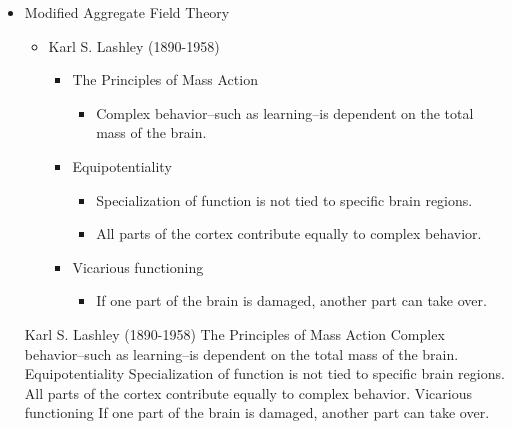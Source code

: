 \begin{itemize}
\item Modified Aggregate Field Theory 
\begin{itemize}
    \item Karl S. Lashley (1890-1958)
    \begin{itemize}
        \item The Principles of Mass Action
        \begin{itemize}
            \item Complex behavior--such as learning--is dependent on the total mass of the brain.
        \end{itemize}
        \item Equipotentiality
        \begin{itemize}
            \item Specialization of function is not tied to specific brain regions.
            \item All parts of the cortex contribute equally to complex behavior.
        \end{itemize}
        \item Vicarious functioning
        \begin{itemize}
            \item If one part of the brain is damaged, another part can take over.
        \end{itemize}
    \end{itemize}
\end{itemize}
    Karl S. Lashley (1890-1958)
        The Principles of Mass Action
            Complex behavior--such as learning--is dependent on the total mass of the brain.
        Equipotentiality
            Specialization of function is not tied to specific brain regions.
            All parts of the cortex contribute equally to complex behavior.
        Vicarious functioning
            If one part of the brain is damaged, another part can take over.
\end{itemize}


